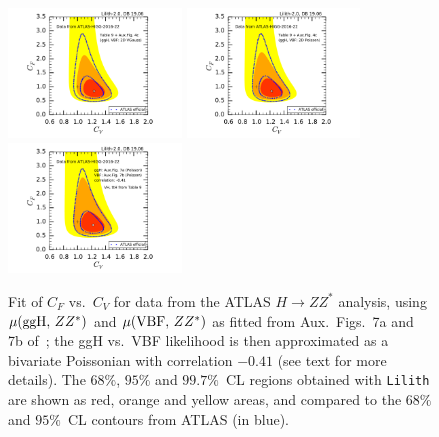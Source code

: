 \begin{figure}[h!]\centering
\hspace{-12mm}\includegraphics[width=0.41\textwidth]{validation/ATLAS/HIGG-2016-22-CVCF-official-vn.pdf}%
\hspace{-12mm}\includegraphics[width=0.41\textwidth]{validation/ATLAS/HIGG-2016-22-CVCF-official-p.pdf}%
\hspace{-12mm}\includegraphics[width=0.41\textwidth]{validation/ATLAS/HIGG-2016-22-CVCF-fitted.pdf}\hspace{-12mm}%
\vspace*{-2mm}
\caption{Fit of $C_F$ vs.\ $C_V$ for data from the ATLAS $H\to ZZ^*$ analysis, 
using $\mu({\rm ggH},\,ZZ^*)$ and $\mu({\rm VBF},\,ZZ^*)$ as fitted from Aux.\ Figs.~7a and 7b of~\cite{Aaboud:2017vzb}; 
the ggH vs.\ VBF likelihood is then approximated as a bivariate Poissonian with correlation $-0.41$ (see text for more details). 
The $68\%$,  $95\%$ and $99.7\%$~CL regions obtained with {\tt Lilith} are shown as red, orange and yellow areas, 
and compared to the $68\%$ and  $95\%$~CL contours from ATLAS (in blue).}
\label{fig:validation_atlas_ZZ}
\end{figure}

